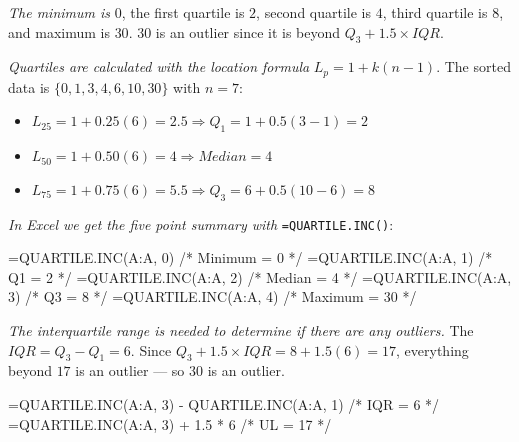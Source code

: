 \documentclass[
  11pt,
  letterpaper,
  DIV=11,
  numbers=noendperiod,
  oneside,
  open=any]{scrreprt}
\newenvironment{Shaded}{\begin{snugshade}}{\end{snugshade}}
\newcommand{\NormalTok}[1]{\textcolor[rgb]{0.00,0.23,0.31}{#1}}
\providecommand{\tightlist}{%
  \setlength{\itemsep}{0pt}\setlength{\parskip}{0pt}}\usepackage{longtable,booktabs,array}
\newenvironment{bsanswerkey}[2]{%
  \begin{tcolorbox}[bsbase, colback=bspaper2, colframe=bsline, fontupper=\small,
    title={\hypertarget{a-#1}{}\label{a-#1}\hyperlink{q-#1}{\textcolor{bsink2}{\MakeUppercase{#2}}}\hfill
      \hyperlink{q-#1}{\textcolor{bsaccent}{\normalfont\footnotesize back to page \pageref{q-#1}}}}]}%
  {\end{tcolorbox}}
\begin{document}
\begin{bsanswerkey}{bsans43}{Exercise 1, question 1}

\emph{The minimum is} \(0\), the first quartile is \(2\), second
quartile is \(4\), third quartile is \(8\), and maximum is \(30\).
\(30\) is an outlier since it is beyond \(Q_{3}+1.5 \times IQR\).

\emph{Quartiles are calculated with the location formula}
\(L_p = 1 + k(n-1)\). The sorted data is \(\{0,1,3,4,6,10,30\}\) with
\(n = 7\):

\begin{itemize}
\tightlist
\item
  \(L_{25} = 1 + 0.25(6) = 2.5 \Rightarrow Q_1 = 1 + 0.5(3-1) = 2\)
\item
  \(L_{50} = 1 + 0.50(6) = 4 \Rightarrow Median = 4\)
\item
  \(L_{75} = 1 + 0.75(6) = 5.5 \Rightarrow Q_3 = 6 + 0.5(10-6) = 8\)
\end{itemize}

\emph{In Excel we get the five point summary with}
\texttt{=QUARTILE.INC()}:

\begin{Shaded}
\begin{Highlighting}[]
\NormalTok{=QUARTILE.INC(A:A, 0)   /* Minimum = 0  */}
\NormalTok{=QUARTILE.INC(A:A, 1)   /* Q1      = 2  */}
\NormalTok{=QUARTILE.INC(A:A, 2)   /* Median  = 4  */}
\NormalTok{=QUARTILE.INC(A:A, 3)   /* Q3      = 8  */}
\NormalTok{=QUARTILE.INC(A:A, 4)   /* Maximum = 30 */}
\end{Highlighting}
\end{Shaded}

\emph{The interquartile range is needed to determine if there are any
outliers.} The \(IQR = Q_3 - Q_1 = 6\). Since
\(Q_3 + 1.5 \times IQR = 8 + 1.5(6) = 17\), everything beyond \(17\) is
an outlier --- so \(30\) is an outlier.

\begin{Shaded}
\begin{Highlighting}[]
\NormalTok{=QUARTILE.INC(A:A, 3) {-} QUARTILE.INC(A:A, 1)   /* IQR = 6  */}
\NormalTok{=QUARTILE.INC(A:A, 3) + 1.5 * 6                 /* UL  = 17 */}
\end{Highlighting}
\end{Shaded}

\end{bsanswerkey}
\end{document}
